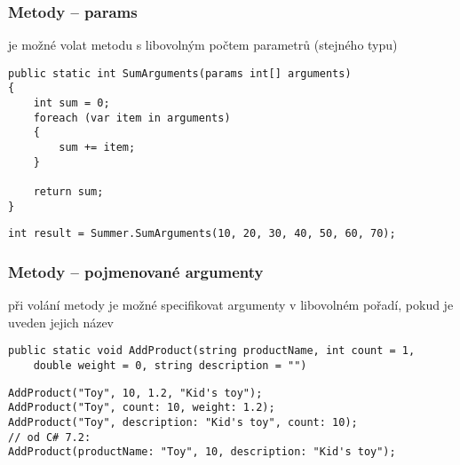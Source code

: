 \nezkouskove

\begin{frame}[fragile]
\frametitle{Metody -- params}
\begin{bitemize}{}
\item je možné volat metodu s libovolným počtem parametrů (stejného typu)
\end{bitemize}

\begin{yesblock}
\begin{lstlisting}[basicstyle=\small]
public static int SumArguments(params int[] arguments)
{
    int sum = 0;
    foreach (var item in arguments)
    {
        sum += item;
    }

    return sum;
}
\end{lstlisting}
\end{yesblock}

\begin{yesblock}
\begin{lstlisting}[basicstyle=\small]
int result = Summer.SumArguments(10, 20, 30, 40, 50, 60, 70);
\end{lstlisting}
\end{yesblock}
\end{frame}





\begin{frame}[fragile]
\frametitle{Metody -- pojmenované argumenty}
\begin{bitemize}{}
\item při volání metody je možné specifikovat argumenty v libovolném pořadí, pokud je uveden jejich název
\end{bitemize}

\begin{yesblock}
\begin{lstlisting}[basicstyle=\small]
public static void AddProduct(string productName, int count = 1, 
    double weight = 0, string description = "")
\end{lstlisting}
\end{yesblock}

\begin{yesblock}
\begin{lstlisting}[basicstyle=\small]
AddProduct("Toy", 10, 1.2, "Kid's toy");
AddProduct("Toy", count: 10, weight: 1.2);
AddProduct("Toy", description: "Kid's toy", count: 10);
// od C# 7.2:
AddProduct(productName: "Toy", 10, description: "Kid's toy"); 
\end{lstlisting}
\end{yesblock}
\end{frame}




